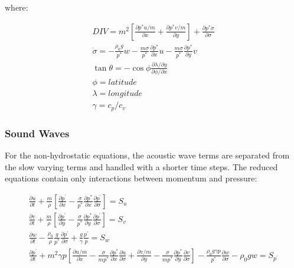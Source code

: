 where:

\begin{eqnarray}
  DIV = m^2 \left[ \frac{\partial{p^{\ast}u/m}}{\partial{x}} +
    \frac{\partial{p^{\ast} v/m}}{\partial{y}} \right] +
    \frac{\partial{p^{\ast} \dot{\sigma}}}{\partial{\sigma}} \\
  \dot{\sigma} = - \frac{\rho_0g}{p^{\ast}}w -
                   \frac{m\sigma}{p^{\ast}}
       \frac{\partial{p^{\ast}}}{\partial{x}}u -
       \frac{m\sigma}{p^{\ast}}
       \frac{\partial{p^{\ast}}}{\partial{y}} v \\
   \tan \theta = - \cos \phi \frac{\partial{\lambda}/ \partial{y}}
          {\partial{\phi}/ \partial{x}} \\ \nonumber
         \phi = latitude \\ \nonumber
         \lambda = longitude \\
   \gamma = c_p / c_v
\end{eqnarray}

\subsubsection{Sound Waves}

For the non-hydrostatic equations, the acoustic wave terms are separated
from the slow varying terms and handled with a shorter time steps. The reduced
equations contain only interactions between momentum and pressure:

\begin{gather}
\frac{\partial{u}}{\partial{t}} + \frac{m}{\rho} \left[
    \frac{\partial{p^\prime}}{\partial{x}} -
    \frac{\sigma}{p^{\ast}}
    \frac{\partial{p^\ast}}{\partial{x}}
    \frac{\partial{p^\prime}}{\partial{\sigma}} \right] = S_u \\
\frac{\partial{v}}{\partial{t}} + \frac{m}{\rho} \left[
    \frac{\partial{p^\prime}}{\partial{y}} -
    \frac{\sigma}{p^{\ast}}
    \frac{\partial{p^\ast}}{\partial{y}}
    \frac{\partial{p^\prime}}{\partial{\sigma}} \right] = S_v \\
\frac{\partial{w}}{\partial{t}} - \frac{\rho_0}{\rho} 
  \frac{g}{p^\ast}\frac{\partial{p^\prime}}{\partial{\sigma}} +
  \frac{g}{\gamma} \frac{p^\prime}{p} = S_w \\
\frac{\partial{p^\prime}}{\partial{t}} + m^2 \gamma p \left[
    \frac{\partial{u/m}}{\partial{x}} -
    \frac{\sigma}{mp^\ast}
    \frac{\partial{p^\ast}}{\partial{x}}
    \frac{\partial{u}}{\partial{\sigma}} +
    \frac{\partial{v/m}}{\partial{y}} -
    \frac{\sigma}{mp^\ast}
    \frac{\partial{p^\ast}}{\partial{y}}
    \frac{\partial{v}}{\partial{\sigma}} \right] -
    \frac{\rho_0 g \gamma p}{p^\ast}
    \frac{\partial{w}}{\partial{\sigma}} - \rho_0 gw = S_{p^\prime}
\end{gather}

